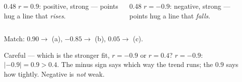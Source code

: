 \documentclass[aspectratio=169, 11pt]{beamer}
\begin{document}
\begin{frame}[t, plain]
  \begin{center}
  \end{center}
  \begin{columns}[T]
    \begin{column}{0.48\textwidth}
      \textbf{$r=0.9$}: positive, strong --- points hug a line that \emph{rises}.
    \end{column}
    \begin{column}{0.48\textwidth}
      \textbf{$r=-0.9$}: negative, strong --- points hug a line that \emph{falls}.
    \end{column}
  \end{columns}
  \vspace{4pt}
  Match: $0.90\to$ (a), \; $-0.85\to$ (b), \; $0.05\to$ (c).
  \vspace{4pt}
  \begin{block}{Careful --- which is the stronger fit, $r=-0.9$ or $r=0.4$?}
    $r=-0.9$: \; $|{-0.9}|=0.9>0.4$. The minus sign says which way the trend runs; the $0.9$
    says how tightly. Negative is \emph{not} weak.
  \end{block}
\end{frame}
\end{document}
